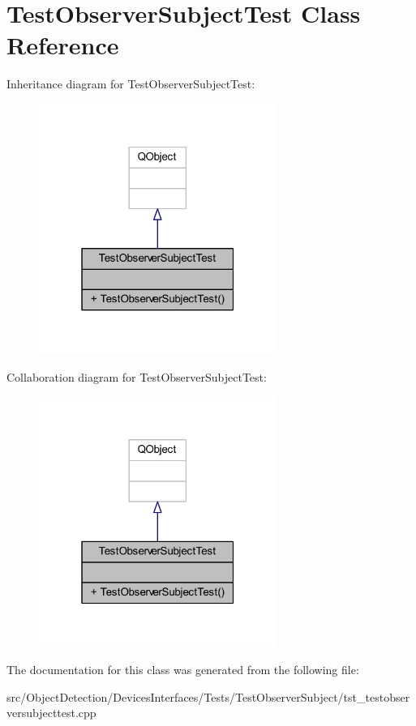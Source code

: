\hypertarget{class_test_observer_subject_test}{}\section{Test\+Observer\+Subject\+Test Class Reference}
\label{class_test_observer_subject_test}


Inheritance diagram for Test\+Observer\+Subject\+Test\+:\nopagebreak
\begin{figure}[H]
\begin{center}
\leavevmode
\includegraphics[width=220pt]{d5/d93/class_test_observer_subject_test__inherit__graph}
\end{center}
\end{figure}


Collaboration diagram for Test\+Observer\+Subject\+Test\+:\nopagebreak
\begin{figure}[H]
\begin{center}
\leavevmode
\includegraphics[width=220pt]{d6/d96/class_test_observer_subject_test__coll__graph}
\end{center}
\end{figure}


The documentation for this class was generated from the following file\+:\begin{DoxyCompactItemize}
\item 
src/\+Object\+Detection/\+Devices\+Interfaces/\+Tests/\+Test\+Observer\+Subject/tst\+\_\+testobserversubjecttest.\+cpp\end{DoxyCompactItemize}
